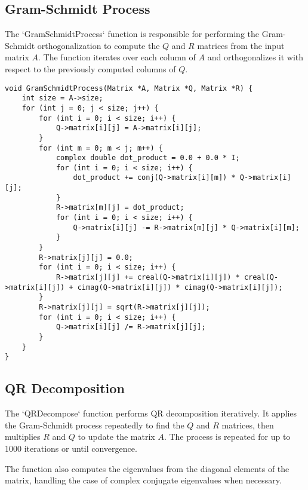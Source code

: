 \documentclass[article]{IEEEtran}
\numberwithin{equation}{enumi}
\numberwithin{figure}{enumi}
\begin{document}
\subsection*{Gram-Schmidt Process}
The `GramSchmidtProcess` function is responsible for performing the Gram-Schmidt orthogonalization to compute the \(Q\) and \(R\) matrices from the input matrix \(A\). The function iterates over each column of \(A\) and orthogonalizes it with respect to the previously computed columns of \(Q\).

\begin{lstlisting}[caption={Gram-Schmidt Process Function}]
void GramSchmidtProcess(Matrix *A, Matrix *Q, Matrix *R) {
    int size = A->size;
    for (int j = 0; j < size; j++) {
        for (int i = 0; i < size; i++) {
            Q->matrix[i][j] = A->matrix[i][j];
        }
        for (int m = 0; m < j; m++) {
            complex double dot_product = 0.0 + 0.0 * I;
            for (int i = 0; i < size; i++) {
                dot_product += conj(Q->matrix[i][m]) * Q->matrix[i][j];
            }
            R->matrix[m][j] = dot_product;
            for (int i = 0; i < size; i++) {
                Q->matrix[i][j] -= R->matrix[m][j] * Q->matrix[i][m];
            }
        }
        R->matrix[j][j] = 0.0;
        for (int i = 0; i < size; i++) {
            R->matrix[j][j] += creal(Q->matrix[i][j]) * creal(Q->matrix[i][j]) + cimag(Q->matrix[i][j]) * cimag(Q->matrix[i][j]);
        }
        R->matrix[j][j] = sqrt(R->matrix[j][j]);
        for (int i = 0; i < size; i++) {
            Q->matrix[i][j] /= R->matrix[j][j];
        }
    }
}
\end{lstlisting}

\subsection*{QR Decomposition}
The `QRDecompose` function performs QR decomposition iteratively. It applies the Gram-Schmidt process repeatedly to find the \(Q\) and \(R\) matrices, then multiplies \(R\) and \(Q\) to update the matrix \(A\). The process is repeated for up to 1000 iterations or until convergence.

The function also computes the eigenvalues from the diagonal elements of the matrix, handling the case of complex conjugate eigenvalues when necessary.
\end{document}
